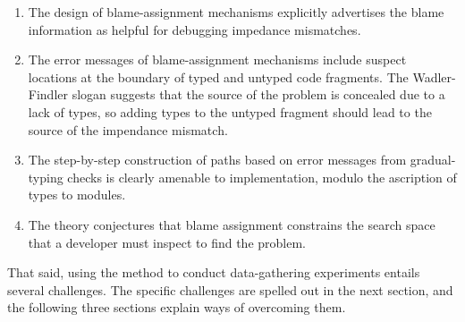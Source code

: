 \begin{enumerate}

\item The design of blame-assignment mechanisms explicitly advertises the blame
information as helpful for debugging impedance mismatches.

\item The error messages of blame-assignment mechanisms include suspect
locations at the boundary of typed and untyped code fragments.
The Wadler-Findler slogan suggests that the source of the problem is concealed due to a lack of types, so
adding types to the untyped fragment should lead to the source of the impendance mismatch.

\item The step-by-step construction of paths based on error messages from
gradual-typing checks is clearly amenable to implementation, modulo the
ascription of types to modules.

\item The theory conjectures that blame assignment constrains the search
space that a developer must inspect to find the problem.

\end{enumerate}
That said, using the method to conduct data-gathering experiments entails
several challenges. The specific challenges are spelled out in the next section,
and the following three sections explain ways of overcoming them.
